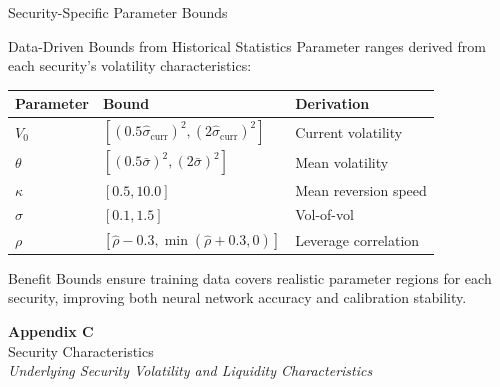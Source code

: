 \documentclass{beamer}
\begin{document}
\begin{frame}{Security-Specific Parameter Bounds}
    \begin{block}{Data-Driven Bounds from Historical Statistics}
        Parameter ranges derived from each security's volatility characteristics:
    \end{block}

    \vspace{0.2cm}

    \begin{table}
        \centering
        \small
        \begin{tabular}{lll}
            \toprule
            \textbf{Parameter} & \textbf{Bound} & \textbf{Derivation} \\
            \midrule
            $V_0$ & $[(0.5\hat{\sigma}_{\text{curr}})^2, (2\hat{\sigma}_{\text{curr}})^2]$ & Current volatility \\
            $\theta$ & $[(0.5\bar{\sigma})^2, (2\bar{\sigma})^2]$ & Mean volatility \\
            $\kappa$ & $[0.5, 10.0]$ & Mean reversion speed \\
            $\sigma$ & $[0.1, 1.5]$ & Vol-of-vol \\
            $\rho$ & $[\hat{\rho} - 0.3, \min(\hat{\rho} + 0.3, 0)]$ & Leverage correlation \\
            \bottomrule
        \end{tabular}
    \end{table}

    \vspace{0.2cm}

    \begin{alertblock}{Benefit}
        Bounds ensure training data covers realistic parameter regions for each security, improving both neural network accuracy and calibration stability.
    \end{alertblock}
\end{frame}

\begin{frame}
    \begin{center}
        \vspace{2cm}
        {\LARGE \textbf{Appendix C}}\\[0.5cm]
        {\Large Security Characteristics}\\[1cm]
        \textit{Underlying Security Volatility and Liquidity Characteristics}
    \end{center}
\end{frame}
\end{document}
